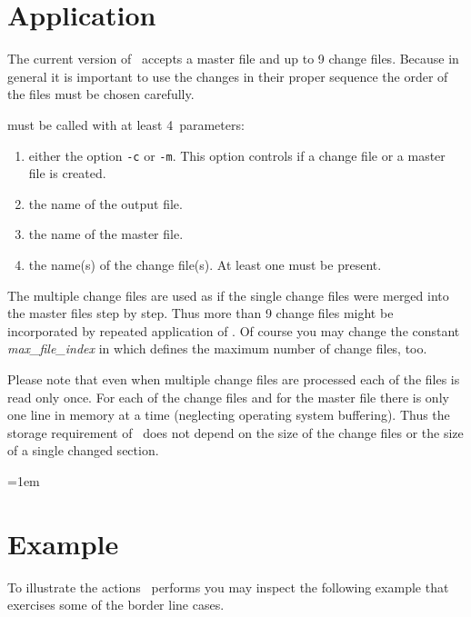 \section{Application}

The current version of \TIE\ accepts a master file and up to 9 change files.
Because in general it is important to use the changes in their proper sequence 
the order of the files must be chosen carefully.

\TIE{} must be called with at least 4~parameters:
%
\begin{enumerate}

\item either the option {\tt -c\/} or {\tt -m}. This option controls if
a change file or a master file is created.

\item the name of the output file.

\item the name of the master file.

\item the name(s) of the change file(s). At least one must be present.

\end{enumerate}

The multiple change files are used as if the single change files were
merged into the master files step by step.  Thus more than 9 change
files might be incorporated by repeated application of \TIE.  Of
course you may change the constant {\it max\_file\_index\/} in \TIE{}
which defines the maximum number of change files, too. 

Please note that even when multiple change files are processed each of
the files is read only once.  For each of the change files and for the
master file there is only one line in memory at a time (neglecting
operating system buffering).  Thus the storage requirement of \TIE\
does not depend on the size of the change files or the size of a
single changed section. 


\newpage


\def\eof{$\langle${\mc EOF}$\rangle$}
\tabcolsep=1em


\section{Example}

To illustrate the actions \TIE\ performs you may inspect the following
example that exercises some of the border line cases. 

